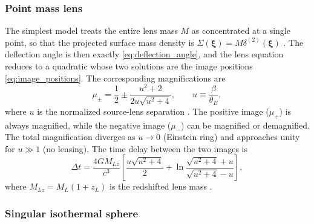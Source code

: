 \subsubsection{Point mass lens}

The simplest model treats the entire lens mass $M$ as 
concentrated at a single point, so that the projected surface mass density is $\Sigma(\boldsymbol{\xi}) = M\delta^{(2)}(\boldsymbol{\xi})$ \cite{pointmasslens}. The deflection angle is then exactly \eqref{eq:deflection_angle}, and the lens equation reduces to a quadratic whose two solutions are the image positions \eqref{eq:image_positions}. The corresponding magnifications are
\begin{equation}
    \mu_{\pm} = \frac{1}{2} \pm
    \frac{u^2 + 2}{2u\sqrt{u^2 + 4}},
    \qquad u \equiv \frac{\beta}{\theta_E},
    \label{eq:PM_magnification}
\end{equation}
where $u$ is the normalized source-lens separation \cite{essentialsstronggravitationallensing}. The positive image ($\mu_+$) is always magnified, while the negative image ($\mu_-$) can be magnified or demagnified. The total magnification diverges as $u \to 0$ (Einstein ring) and approaches unity for $u \gg 1$ (no lensing). The time delay between the two images is
\begin{equation}
    \Delta t = \frac{4GM_{Lz}}{c^3}\left[
    \frac{u\sqrt{u^2+4}}{2} +
    \ln\frac{\sqrt{u^2+4}+u}{\sqrt{u^2+4}-u}
    \right],
\end{equation}
where $M_{Lz} = M_L(1+z_L)$ is the redshifted lens mass \cite{pointmasslens}.  

\subsubsection{Singular isothermal sphere}

